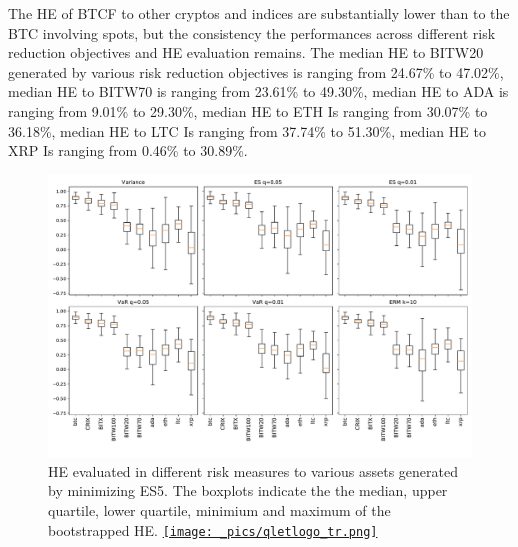 The HE of BTCF to other cryptos and indices are substantially lower than to the BTC involving spots, but the consistency the performances across different risk reduction objectives and HE evaluation remains.
The median HE to BITW20 generated by various risk reduction objectives is ranging from 24.67\% to 47.02\%, median HE to BITW70 is ranging from 23.61\% to 49.30\%,
median HE to ADA is ranging from 9.01\% to 29.30\%, median HE to ETH Is ranging from 30.07\% to 36.18\%, median HE to LTC Is ranging from 37.74\% to 51.30\%,
median HE to XRP Is ranging from 0.46\% to 30.89\%.
\begin{figure}[h]
\includegraphics[width=\textwidth]{_pics/ES5_HE_boxplot.pdf}
  \caption{HE evaluated in different risk measures to various assets generated by minimizing ES5.
            The boxplots indicate the the median, upper quartile, lower quartile, minimium and maximum of the bootstrapped HE.
  \href{http://www.quantlet.com/}{\texttt{[image: \_pics/qletlogo\_tr.png]}} }
\label{fig:HEboxplot}
\end{figure}

